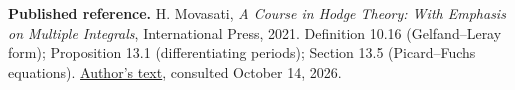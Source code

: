 \medskip\noindent
{\bf Published reference.}
H. Movasati, {\it A Course in Hodge
Theory: With Emphasis on Multiple
Integrals}, International Press, 2021.
Definition 10.16 (Gelfand--Leray form);
Proposition 13.1 (differentiating periods);
Section 13.5 (Picard--Fuchs equations).
\href{https://w3.impa.br/~hossein/%
myarticles/hodgetheory.pdf}
{Author's text}, consulted
October 14, 2026.


